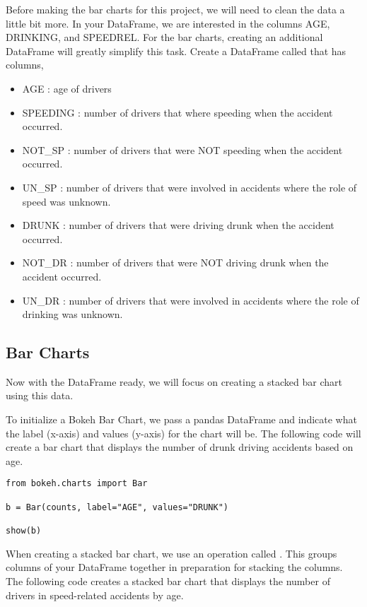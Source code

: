 \begin{problem} \label{prob:counts}
Before making the bar charts for this project, we will need to clean the data a
little bit more. In your  DataFrame, we are interested in the columns
AGE, DRINKING, and SPEEDREL. For the bar charts, creating an additional DataFrame
will greatly simplify this task. Create a DataFrame called  that has
columns,
\begin{itemize}
    \item AGE : age of drivers
    \item SPEEDING : number of drivers that where speeding when the accident
                occurred.
    \item NOT\_SP : number of drivers that were NOT speeding when the accident
                occurred.
    \item UN\_SP : number of drivers that were involved in accidents where the
                role of speed was unknown.
    \item DRUNK : number of drivers that were driving drunk when the accident
                occurred.
    \item NOT\_DR : number of drivers that were NOT driving drunk when the
                accident occurred.
    \item UN\_DR : number of drivers that were involved in accidents where the
                role of drinking was unknown.
\end{itemize}
\end{problem}

\subsection*{Bar Charts}
Now with the  DataFrame ready, we will focus on creating a stacked
bar chart using this data.

To initialize a Bokeh Bar Chart, we pass a pandas DataFrame and indicate what
the label (x-axis) and values (y-axis) for the chart will be. The following
code will create a bar chart that displays the number of drunk driving accidents
based on age.

\begin{lstlisting}
from bokeh.charts import Bar

b = Bar(counts, label="AGE", values="DRUNK")

show(b)
\end{lstlisting}

When creating a stacked bar chart, we use an operation called . This
groups columns of your DataFrame together in preparation for stacking the
columns. The following code creates a stacked bar chart that displays the number
of drivers in speed-related accidents by age.

